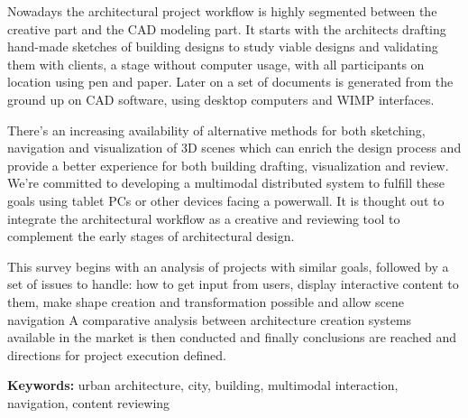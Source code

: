 Nowadays the architectural project workflow is highly segmented
between the creative part and the CAD modeling part.
It starts with the architects drafting hand-made sketches of building designs
to study viable designs and validating them with clients, a stage without computer usage, 
with all participants on location using pen and paper.
Later on a set of documents is generated from the ground up on CAD software, 
using desktop computers and WIMP interfaces.

There's an increasing availability of alternative methods for both sketching, navigation and visualization
of 3D scenes which can enrich the design process and provide a better experience for both
building drafting, visualization and review.
We're committed to developing a multimodal distributed system to fulfill these goals
using tablet PCs or other devices facing a powerwall.
It is thought out to integrate the architectural workflow as a creative and reviewing tool
to complement the early stages of architectural design.

This survey begins with an analysis of projects with similar goals,
followed by a set of issues to handle:
how to get input from users,
display interactive content to them,
make shape creation and transformation possible and
allow scene navigation
A comparative analysis between architecture creation systems available in the market is then conducted and
finally conclusions are reached and directions for project execution defined.

\textbf{Keywords:} urban architecture, city, building, multimodal interaction, navigation, content reviewing

